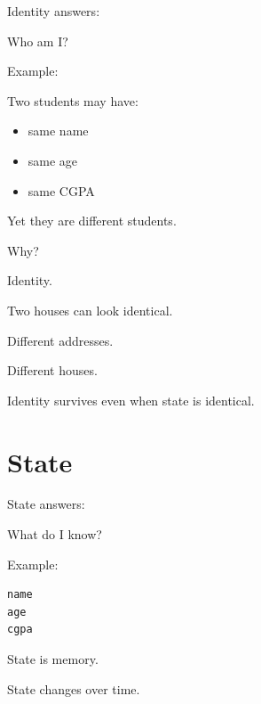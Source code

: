 \documentclass[11pt,a4paper]{book}
\begin{document}
\begin{idea}

Identity answers:

\begin{center}
Who am I?\@
\end{center}

\end{idea}

Example:

Two students may have:

\begin{itemize}
\item same name
\item same age
\item same CGPA
\end{itemize}

Yet they are different students.

Why?

Identity.

\begin{mentalmodel}

Two houses can look identical.

Different addresses.

Different houses.

Identity survives even when state is identical.

\end{mentalmodel}


\section{State}

\begin{idea}

State answers:

\begin{center}
What do I know?
\end{center}

\end{idea}

Example:

\begin{verbatim}
name
age
cgpa
\end{verbatim}

State is memory.

State changes over time.

\end{document}
